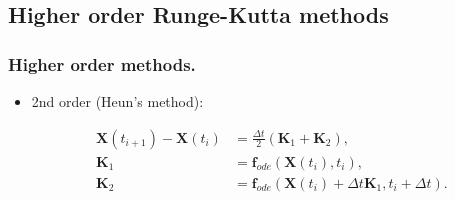 \documentclass{beamer}
\begin{document}
\subsection{Higher order Runge-Kutta methods}


\begin{frame}
\frametitle{Higher order methods.}
\begin{itemize}

\item<1-> 2nd order (Heun's method):

\begin{align*}
\mathbf{X}(t_{i+1})-\mathbf{X}(t_{i}) &= \frac{\Delta t}{2}(\mathbf{K}_1+\mathbf{K}_2),\\
\mathbf{K}_1 &= \mathbf{f}_{ode}(\mathbf{X}(t_i),t_i),\\
\mathbf{K}_2 &= \mathbf{f}_{ode}(\mathbf{X}(t_i)+\Delta t\mathbf{K}_1,t_i+\Delta t).
\end{align*}

\end{itemize}
\end{frame}
\end{document}
